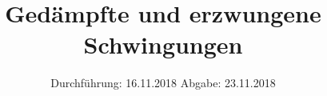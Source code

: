 

\subject{V354}
\title{ Gedämpfte und erzwungene Schwingungen}
\date{
  Durchführung: 16.11.2018
  \hspace{3em}
  Abgabe: 23.11.2018
}



\maketitle
\thispagestyle{empty}
\tableofcontents
\newpage









\printbibliography


